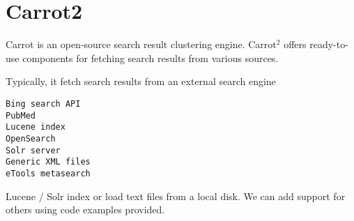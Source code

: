 \section{Carrot2}
\label{sec:Carrot}

Carrot is an open-source search result clustering engine.
Carrot$^2$ offers ready-to-use components for fetching search results from
various sources.

Typically, it fetch search results from an external search engine
\begin{verbatim}
Bing search API
PubMed
Lucene index
OpenSearch
Solr server
Generic XML files
eTools metasearch
\end{verbatim}
Lucene / Solr index or load text files from a local disk. We can add support for
others using code examples provided.
